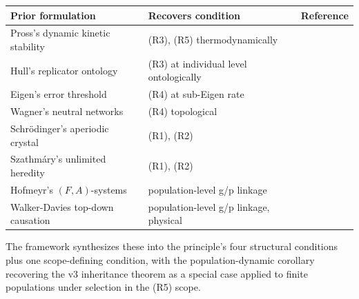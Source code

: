 \documentclass[11pt]{article}
\theoremstyle{plain}
\theoremstyle{definition}
\begin{document}
\begin{center}
\begin{tabular}{lll}
\toprule
Prior formulation & Recovers condition & Reference \\
\midrule
Pross's dynamic kinetic stability & (R3), (R5) thermodynamically & \citep{Pross2011} \\
Hull's replicator ontology & (R3) at individual level ontologically & \citep{Hull1980} \\
Eigen's error threshold & (R4) at sub-Eigen rate & \citep{Eigen1971} \\
Wagner's neutral networks & (R4) topological & \citep{Wagner2005} \\
Schr\"odinger's aperiodic crystal & (R1), (R2) & \citep{Schrodinger1944} \\
Szathm\'ary's unlimited heredity & (R1), (R2) & \citep{Szathmary2000} \\
Hofmeyr's $(F, A)$-systems & population-level g/p linkage & \citep{Hofmeyr2017} \\
Walker-Davies top-down causation & population-level g/p linkage, physical & \citep{WalkerDavies2013} \\
\bottomrule
\end{tabular}
\end{center}

The framework synthesizes these into the principle's four structural conditions plus one scope-defining condition, with the population-dynamic corollary recovering the v3 inheritance theorem as a special case applied to finite populations under selection in the (R5) scope.




\end{document}
